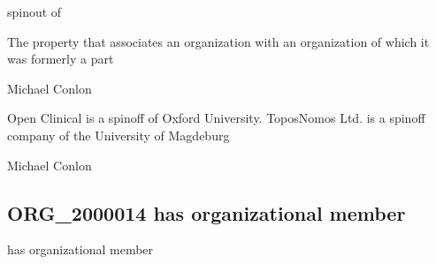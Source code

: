\documentclass[letterpaper,10pt,english]{sphinxmanual}
\begin{document}
\begin{sphinxShadowBox}

\sphinxAtStartPar
spinout of
\end{sphinxShadowBox}

\begin{sphinxShadowBox}

\sphinxAtStartPar
The property that associates an organization with an organization of which it was formerly a part
\end{sphinxShadowBox}

\begin{sphinxShadowBox}

\sphinxAtStartPar
Michael Conlon 
\end{sphinxShadowBox}

\begin{sphinxShadowBox}

\sphinxAtStartPar
Open Clinical is a spin\sphinxhyphen{}off of Oxford University. ToposNomos Ltd. is a spin\sphinxhyphen{}off company of the University of Magdeburg
\end{sphinxShadowBox}

\begin{sphinxShadowBox}

\sphinxAtStartPar
Michael Conlon 
\end{sphinxShadowBox}
\begin{quote}

\ignorespaces \end{quote}


\subsection{ORG\_2000014 \sphinxhyphen{} has organizational member}
\label{\detokenize{doc-ORG_2000014:org-2000014-has-organizational-member}}\label{\detokenize{doc-ORG_2000014:index-0}}\label{\detokenize{doc-ORG_2000014::doc}}
\begin{sphinxShadowBox}

\sphinxAtStartPar
has organizational member
\end{sphinxShadowBox}
\end{document}
